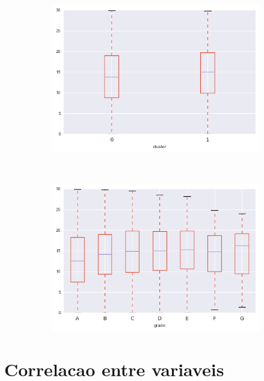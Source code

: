 \begin{apendicesenv}
\begin{figure}[t!]
\begin{subfigure}[t]{0.5\textwidth}
			\centerline{\includegraphics[width=1.05\textwidth]{img/dti_by_cluster}}
    	\end{subfigure}%
    	~ 
    	\begin{subfigure}[t]{0.5\textwidth}
    		\centering
   
			\centerline{\includegraphics[width=1.05\textwidth]{img/dti_by_grade}}

    	\end{subfigure}
\end{figure}



\chapter{Correlacao entre variaveis}



\end{apendicesenv}
